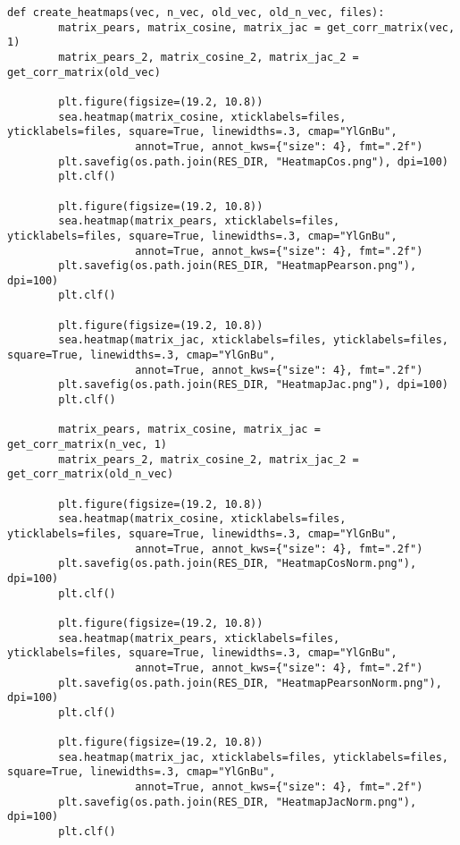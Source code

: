 \begin{lstlisting}[label=heatmaps_build, caption={Функция вывода результатов}]
    def create_heatmaps(vec, n_vec, old_vec, old_n_vec, files):
        matrix_pears, matrix_cosine, matrix_jac = get_corr_matrix(vec, 1)
        matrix_pears_2, matrix_cosine_2, matrix_jac_2 = get_corr_matrix(old_vec)

        plt.figure(figsize=(19.2, 10.8))
        sea.heatmap(matrix_cosine, xticklabels=files, yticklabels=files, square=True, linewidths=.3, cmap="YlGnBu",
                    annot=True, annot_kws={"size": 4}, fmt=".2f")
        plt.savefig(os.path.join(RES_DIR, "HeatmapCos.png"), dpi=100)
        plt.clf()

        plt.figure(figsize=(19.2, 10.8))
        sea.heatmap(matrix_pears, xticklabels=files, yticklabels=files, square=True, linewidths=.3, cmap="YlGnBu",
                    annot=True, annot_kws={"size": 4}, fmt=".2f")
        plt.savefig(os.path.join(RES_DIR, "HeatmapPearson.png"), dpi=100)
        plt.clf()

        plt.figure(figsize=(19.2, 10.8))
        sea.heatmap(matrix_jac, xticklabels=files, yticklabels=files, square=True, linewidths=.3, cmap="YlGnBu",
                    annot=True, annot_kws={"size": 4}, fmt=".2f")
        plt.savefig(os.path.join(RES_DIR, "HeatmapJac.png"), dpi=100)
        plt.clf()

        matrix_pears, matrix_cosine, matrix_jac = get_corr_matrix(n_vec, 1)
        matrix_pears_2, matrix_cosine_2, matrix_jac_2 = get_corr_matrix(old_n_vec)

        plt.figure(figsize=(19.2, 10.8))
        sea.heatmap(matrix_cosine, xticklabels=files, yticklabels=files, square=True, linewidths=.3, cmap="YlGnBu",
                    annot=True, annot_kws={"size": 4}, fmt=".2f")
        plt.savefig(os.path.join(RES_DIR, "HeatmapCosNorm.png"), dpi=100)
        plt.clf()

        plt.figure(figsize=(19.2, 10.8))
        sea.heatmap(matrix_pears, xticklabels=files, yticklabels=files, square=True, linewidths=.3, cmap="YlGnBu",
                    annot=True, annot_kws={"size": 4}, fmt=".2f")
        plt.savefig(os.path.join(RES_DIR, "HeatmapPearsonNorm.png"), dpi=100)
        plt.clf()

        plt.figure(figsize=(19.2, 10.8))
        sea.heatmap(matrix_jac, xticklabels=files, yticklabels=files, square=True, linewidths=.3, cmap="YlGnBu",
                    annot=True, annot_kws={"size": 4}, fmt=".2f")
        plt.savefig(os.path.join(RES_DIR, "HeatmapJacNorm.png"), dpi=100)
        plt.clf()
\end{lstlisting}

